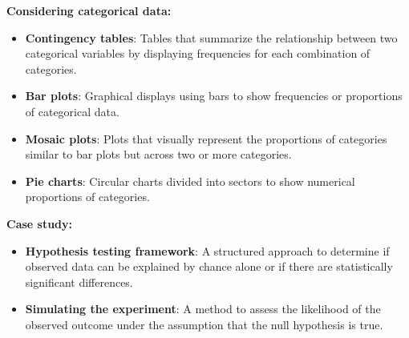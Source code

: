 \documentclass{article}
\begin{document}
\textbf{Considering categorical data:}
\begin{itemize}
    \item \textbf{Contingency tables}: Tables that summarize the relationship between two categorical variables by displaying frequencies for each combination of categories.
    \item \textbf{Bar plots}: Graphical displays using bars to show frequencies or proportions of categorical data.
    \item \textbf{Mosaic plots}: Plots that visually represent the proportions of categories similar to bar plots but across two or more categories.
    \item \textbf{Pie charts}: Circular charts divided into sectors to show numerical proportions of categories.
\end{itemize}

\textbf{Case study:}
\begin{itemize}
    \item \textbf{Hypothesis testing framework}: A structured approach to determine if observed data can be explained by chance alone or if there are statistically significant differences.
    \item \textbf{Simulating the experiment}: A method to assess the likelihood of the observed outcome under the assumption that the null hypothesis is true.
\end{itemize}
\end{document}
